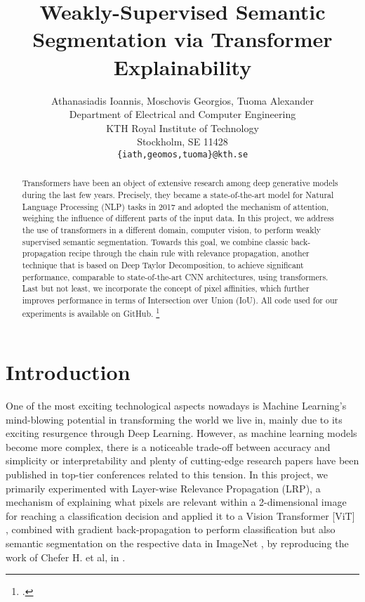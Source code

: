 \documentclass{article}
\title{Weakly-Supervised Semantic Segmentation via Transformer Explainability}
\author{%
   Athanasiadis Ioannis, Moschovis Georgios, Tuoma Alexander \\
  Department of Electrical and Computer Engineering\\
  KTH Royal Institute of Technology\\
  Stockholm, SE 11428 \\
  \texttt{\{iath,geomos,tuoma\}@kth.se} \\
}
\begin{document}
\maketitle

\begin{abstract}

Transformers have been an object of extensive research among deep generative models during the last few years. Precisely, they became a state-of-the-art model for Natural Language Processing (NLP) tasks in 2017 and adopted the mechanism of attention, weighing the influence of different parts of the input data. In this project, we address the use of transformers in a different domain, computer vision, to perform weakly supervised semantic segmentation. Towards this goal, we combine classic back-propagation recipe through the chain rule with relevance propagation, another technique that is based on Deep Taylor Decomposition, to achieve significant performance, comparable to state-of-the-art CNN architectures, using transformers. Last but not least, we incorporate the concept of pixel affinities, which further improves performance in terms of Intersection over Union (IoU). All code used for our experiments is available on GitHub. \footnote{ .}

\end{abstract}

\section{Introduction}
\label{section:intro}
One of the most exciting technological aspects nowadays is Machine Learning's mind-blowing potential in transforming the world we live in, mainly due to its exciting resurgence through Deep Learning. However, as machine learning models become more complex, there is a noticeable trade-off between accuracy and simplicity or interpretability \cite{explanations} and plenty of cutting-edge research papers have been published in top-tier conferences related to this tension. In this project, we primarily experimented with Layer-wise Relevance Propagation (LRP), a mechanism of explaining what pixels are relevant within a 2-dimensional image for reaching a classification decision \cite{renormalizationLRP} and applied it to a Vision Transformer [ViT] \cite{visiontransformer}, combined with gradient back-propagation to perform classification but also semantic segmentation on the respective data in ImageNet \cite{russakovsky2015ImageNet, imagenet-seg}, by reproducing the work of Chefer H. et al, in \cite{mainpaper}.
\end{document}
